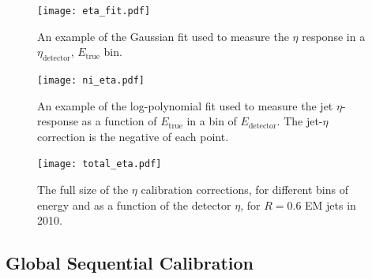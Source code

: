 
\begin{figure}
\centering
\texttt{[image: eta\_fit.pdf]}
\caption{An example of the Gaussian fit used to measure the $\eta$ response in a $\eta_\mathrm{detector}$, $E_\mathrm{true}$ bin.}
\label{fig:jet-reconstruction:eta-fit}
\end{figure}



\begin{figure}
\centering
\texttt{[image: ni\_eta.pdf]}
\caption{An example of the log-polynomial fit used to measure the jet $\eta$-response as a function of $E_\mathrm{true}$ in a bin of $E_\mathrm{detector}$. The jet-$\eta$ correction is the negative of each point.}
\label{fig:jet-reconstruction:ni-eta}
\end{figure}



\begin{figure}
\centering
\texttt{[image: total\_eta.pdf]}
\caption{The full size of the $\eta$ calibration corrections, for different bins of energy and as a function of the detector $\eta$, for $R=0.6$ EM jets in 2010.}
\label{fig:jet-reconstruction:total-eta}
\end{figure}




\subsection{Global Sequential Calibration}
\label{jet-reconstruction:calibration:gsc}

